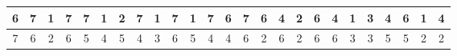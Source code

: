 \begin{sidewaystable}[]
\begin{tabular}{|c|c|c|c|c|c|c|c|c|c|c|c|c|c|c|c|c|c|c|c|c|c|c|c|c|}
    6       & 7                                               & 1                                               & 7                                               & 7                                               & 1                                               & 2                                               & 7                                               & 1                                               & 7                                               & 1                                                & 7                                                & 6                                                 &    7                                               & 6                                               & 4                                               & 2                                               & 6                                               & 4                                               & 1                                               & 3                                               & 4                                               & 6                                                & 1                                                & 4                                                \\ \hline
    7       & 6                                               & 2                                               & 6                                               & 5                                               & 4                                               & 5                                               & 4                                               & 3                                               & 6                                               & 5                                                & 4                                                & 4                                                 &    6                                               & 2                                               & 6                                               & 2                                               & 6                                               & 6                                               & 3                                               & 3                                               & 5                                               & 5                                                & 2                                                & 2                                                \\ \hline

\end{tabular}
\end{sidewaystable}
